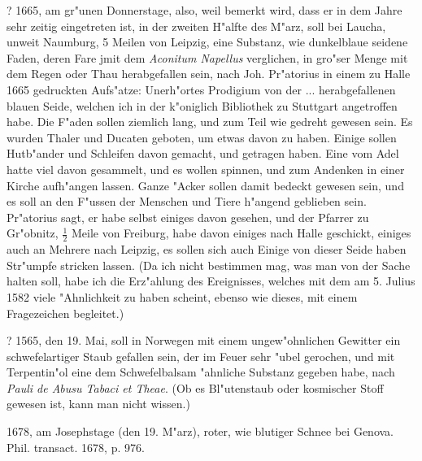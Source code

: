 \documentclass[a4paper, 11pt, oneside, polutonikogreek, german]{article}
\begin{document}
? 1665, am gr"unen Donnerstage, also, weil bemerkt wird, dass er in dem Jahre sehr zeitig eingetreten ist, in der zweiten H"alfte des M"arz, soll bei Laucha, unweit Naumburg, 5 Meilen von Leipzig, eine Substanz, wie dunkelblaue seidene Faden, deren Fare jmit dem \emph{Aconitum Napellus} verglichen, in gro"ser Menge mit dem Regen oder Thau herabgefallen sein, nach Joh. Pr"atorius in einem zu Halle 1665 gedruckten Aufs"atze: Unerh"ortes Prodigium von der ... herabgefallenen blauen Seide, welchen ich in der k"oniglich Bibliothek zu Stuttgart angetroffen habe. Die F"aden sollen ziemlich lang, und zum Teil wie gedreht gewesen sein. Es wurden Thaler und Ducaten geboten, um etwas davon zu haben. Einige sollen Hutb"ander und Schleifen davon gemacht, und getragen haben. Eine vom Adel hatte viel davon gesammelt, und es wollen spinnen, und zum Andenken in einer Kirche aufh"angen lassen. Ganze "Acker sollen damit bedeckt gewesen sein, und es soll an den F"ussen der Menschen und Tiere h"angend geblieben sein. Pr"atorius sagt, er habe selbst einiges davon gesehen, und der Pfarrer zu Gr"obnitz, $\mathfrak{\frac{1}{2}}$ Meile von Freiburg, habe davon einiges nach Halle geschickt, einiges auch an Mehrere nach Leipzig, es sollen sich auch Einige von dieser Seide haben Str"umpfe stricken lassen. (Da ich nicht bestimmen mag, was man von der Sache halten soll, habe ich die Erz"ahlung des Ereignisses, welches mit dem am 5. Julius 1582 viele "Ahnlichkeit zu haben scheint, ebenso wie dieses, mit einem Fragezeichen begleitet.)

? 1565, den 19. Mai, soll in Norwegen mit einem ungew"ohnlichen Gewitter ein schwefelartiger Staub gefallen sein, der im Feuer sehr "ubel gerochen, und mit Terpentin"ol eine dem Schwefelbalsam "ahnliche Substanz gegeben habe, nach \emph{Pauli de Abusu Tabaci et Theae}. (Ob es Bl"utenstaub oder kosmischer Stoff gewesen ist, kann man nicht wissen.)

1678, am Josephstage (den 19. M"arz), roter, wie blutiger Schnee bei Genova. Phil. transact. 1678, p. 976.
\end{document}
